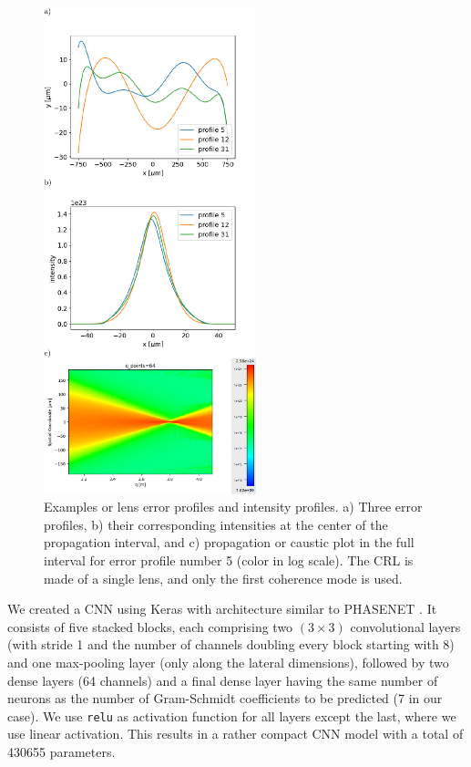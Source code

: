 \documentclass[preprint]{iucr}
\begin{document}
\begin{figure}\label{fig:sample}
\includegraphics[width=0.55\textwidth]{figures/figure2.pdf}

    
    \caption{Examples or lens error profiles and intensity profiles. a) Three error profiles, b) their corresponding intensities at the center of the propagation interval, and c) propagation or caustic plot in the full interval for error profile number 5 (color in log scale). The CRL is made of a single lens, and only the first coherence mode is used.
    }
\end{figure}

We created a CNN using Keras \cite{keras} with architecture similar to PHASENET \cite{Saha2020}. It consists of five stacked blocks, each comprising two $(3 \times 3 )$ convolutional layers (with stride 1 and the number of channels doubling every block starting with 8) and one max-pooling layer (only along the lateral dimensions), followed by two dense layers (64 channels) and a final dense layer having the same number of neurons as the number of Gram-Schmidt coefficients to be predicted (7 in our case). We use \texttt{relu} as activation function for all layers except the last, where we use linear activation. This results in a rather compact CNN model with a total of 430655 parameters.
\end{document}
